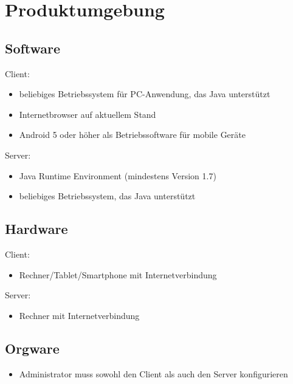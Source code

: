 \section{Produktumgebung}
\subsection{Software}
Client: 
\begin{itemize}
\item beliebiges Betriebssystem für PC-Anwendung, das Java unterstützt 
\item Internetbrowser auf aktuellem Stand 
\item Android 5 oder höher als Betriebssoftware für mobile Geräte
\end{itemize} 
Server: 
\begin{itemize}
\item Java Runtime Environment (mindestens Version 1.7) 
\item beliebiges Betriebssystem, das Java unterstützt 
\end{itemize}

\subsection{Hardware}
Client: 
\begin{itemize}
\item Rechner/Tablet/Smartphone mit Internetverbindung 
\end{itemize} 
Server: 
\begin{itemize}
\item Rechner mit Internetverbindung 
\end{itemize}

\subsection{Orgware}
\begin{itemize}
\item Administrator muss sowohl den Client als auch den Server konfigurieren
\end{itemize}
